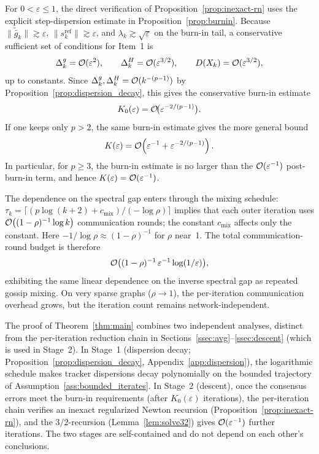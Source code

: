 \documentclass[review,onefignum,onetabnum]{siamart171218}
\begin{document}
	\begin{remark}\label{rem:burnin_order}
		For $0<\varepsilon\le1$, the direct verification of
		Proposition~\ref{prop:inexact-rn}
		uses the explicit step-dispersion estimate in
		Proposition~\ref{prop:burnin}. Because
		$\|\tilde{\bar g}_k\|\gtrsim\varepsilon$,
		$\|s_k^{\mathrm{ref}}\|\gtrsim\varepsilon$, and
		$\lambda_k\gtrsim\sqrt{\varepsilon}$ on the burn-in tail, a
		conservative sufficient set of conditions for Item~1 is
		\[
		\Delta_k^g=\mathcal{O}(\varepsilon^2),\qquad
		\Delta_k^H=\mathcal{O}(\varepsilon^{3/2}),\qquad
		D(X_k)=\mathcal{O}(\varepsilon^{3/2}),
		\]
		up to constants. Since
		$\Delta_k^g,\Delta_k^H=\mathcal{O}(k^{-(p-1)})$ by
		Proposition~\ref{prop:dispersion_decay}, this gives the
		conservative burn-in estimate
		\[
		K_0(\varepsilon)=\mathcal{O}\!\bigl(\varepsilon^{-2/(p-1)}\bigr).
		\]
		If one keeps only $p>2$, the same burn-in estimate gives the
		more general bound
		\[
		K(\varepsilon)
		=\mathcal{O}\!\left(\varepsilon^{-1}+\varepsilon^{-2/(p-1)}\right).
		\]
		In particular, for $p\ge3$, the burn-in estimate is no larger
		than the $\mathcal{O}(\varepsilon^{-1})$ post-burn-in term, and hence
		$K(\varepsilon)=\mathcal{O}(\varepsilon^{-1})$.
		
		The dependence on the spectral gap enters through the mixing schedule:
		$\tau_k=\lceil (p\log(k+2)+c_{\mathrm{mix}})/(-\log\rho)\rceil$
		implies that each
		outer iteration uses $\mathcal{O}\bigl((1-\rho)^{-1}\log k\bigr)$
		communication rounds; the constant $c_{\mathrm{mix}}$ affects only
		the constant. Here $-1/\log\rho\approx(1-\rho)^{-1}$ for $\rho$ near~1.
		The total communication-round budget is therefore
		\[
		\mathcal{O}\bigl((1-\rho)^{-1}\,\varepsilon^{-1}\log(1/\varepsilon)\bigr),
		\]
		exhibiting the same linear dependence on the inverse spectral gap
		as repeated gossip mixing.
		On very sparse graphs ($\rho\to 1$), the per-iteration communication
		overhead grows, but the iteration count remains network-independent.
	\end{remark}

	\begin{remark}\label{rem:two_stages}
		The proof of Theorem~\ref{thm:main} combines two independent
		analyses, distinct from the per-iteration reduction chain in
		Sections~\ref{ssec:avg}--\ref{ssec:descent} (which is used in Stage~2).
		In Stage~1 (dispersion decay;
		Proposition~\ref{prop:dispersion_decay},
		Appendix~\ref{app:dispersion}), the logarithmic schedule
		makes tracker dispersions decay polynomially on the bounded
		trajectory of Assumption~\ref{ass:bounded_iterates}.
		In Stage~2 (descent), once the consensus errors meet the
		burn-in requirements
		(after $K_0(\varepsilon)$ iterations), the per-iteration chain
		verifies an inexact regularized Newton recursion
		(Proposition~\ref{prop:inexact-rn}), and the $3/2$-recursion
		(Lemma~\ref{lem:solve32}) gives $\mathcal{O}(\varepsilon^{-1})$ further
		iterations.
		The two stages are self-contained and do not depend on each other's conclusions.
	\end{remark}
	
\end{document}
